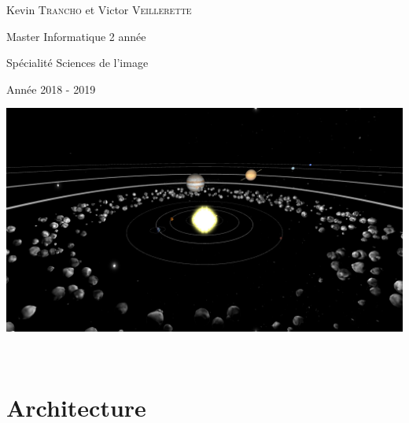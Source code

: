 \documentclass[11pt,a4paper]{article}
\begin{document}
\begin{titlepage}
\begin{sffamily}
\begin{center}
{\begin{Large}Kevin \textsc{Trancho} et Victor \textsc{Veillerette}\\[0.20cm]\end{Large}}
{\begin{large}Master Informatique 2 année\\[0.10cm]\end{large}}
{\begin{large}Spécialité Sciences de l'image\\[0.10cm]\end{large}}
{\begin{large}Année 2018 - 2019\\[1.5cm]\end{large}}


\includegraphics[width=0.95\columnwidth]{First.png}

~\\[1cm]

\end{center}
\end{sffamily}
\end{titlepage}

\newpage
\tableofcontents
\newpage

\section{Architecture}
\end{document}
